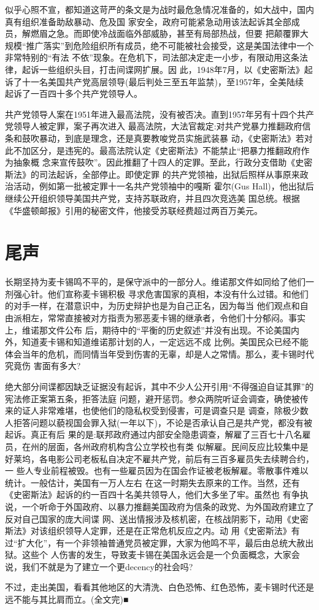 \documentclass[10pt]{article}
\begin{document}
{似乎心照不宣，都知道这苛严的条文是为战时最危急情况准备的，如大战中，国内真有组织准备助敌暴动、危及国
家安全，政府可能紧急动用该法起诉其全部成员，解燃眉之急。而即使冷战面临外部威胁，甚至有局部热战，但要
把颠覆罪大规模``推广落实''到危险组织所有成员，绝不可能被社会接受，这是美国法律中一个非常特别的``有法
不依''现象。在危机下，司法部决定走一小步，有限动用这条法律，起诉一些组织头目，打击间谍网扩展。因
此，1948年7月，以《史密斯法》起诉了十一名美国共产党高层领导(最后判处三至五年监禁)，至1957年，全美陆续
起诉了一百四十多个共产党领导人。

共产党领导人案在1951年进入最高法院，没有被否决。直到1957年另有十四个共产党领导人被定罪，案子再次进入
最高法院，大法官裁定:对共产党暴力推翻政府信条和鼓吹暴动，到底是理念，还是真要教唆党员实施武装暴
动，《史密斯法》若对此不加区分，是违宪的。最高法院认定《史密斯法》不能禁止``把暴力推翻政府作为抽象概
念来宣传鼓吹''。因此推翻了十四人的定罪。至此，行政分支借助《史密斯法》的司法起诉，全部停止。即使定罪
的共产党领袖，出狱后照样从事原来政治活动，例如第一批被定罪十一名共产党领袖中的嘎斯
\textperiodcentered 霍尔(Gus Hall)，他出狱后继续公开组织领导美国共产党，支持苏联政府，并且四次竞选美
国总统。根据《华盛顿邮报》引用的秘密文件，他接受苏联经费超过两百万美元。

\pagebreak
\section{尾声}

长期坚持为麦卡锡鸣不平的，是保守派中的一部分人。维诺那文件如同给了他们一剂强心针。他们宣称麦卡锡积极
寻求危害国家的真相，本没有什么过错。和他们的对手一样，在潜意识中，为历史辩护也是为自己正名，因为每当
他们观点和自由派相左，常常直接被对方指责为邪恶麦卡锡的继承者，令他们十分郁闷。事实上，维诺那文件公布
后，期待中的``平衡的历史叙述''并没有出现。不论美国内外，知道麦卡锡和知道维诺那计划的人，一定远远不成
比例。美国民众已经不能体会当年的危机，而同情当年受到伤害的无辜，却是人之常情。那么，麦卡锡时代究竟伤
害面有多大?

绝大部分间谍都因缺乏证据没有起诉，其中不少人公开引用``不得强迫自证其罪''的宪法修正案第五条，拒答法庭
问题，避开惩罚。参众两院听证会调查，确使被传来的证人非常难堪，也使他们的隐私权受到侵害，可是调查只是
调查，除极少数人拒答问题以藐视国会罪入狱(一年以下)，不论是否承认自己是共产党，都没有被起诉。真正有后
果的是:联邦政府通过内部安全隐患调查，解雇了三百七十八名雇员，在州的层面，各州政府机构含公立学校也有类
似解雇。民间反应比较集中是好莱坞，各电影公司老板私自决定不雇共产党，前后有三百多雇员失去续聘合约，一
些人专业前程被毁。也有一些雇员因为在国会作证被老板解雇。零散事件难以统计。一般估计，美国有一万人左右
在这一时期失去原来的工作。当然，还有《史密斯法》起诉的约一百四十名美共领导人，他们大多坐了牢。虽然也
有争执说，一个听命于外国政府、以暴力推翻美国政府为信条的政党、为外国政府建立了反对自己国家的庞大间谍
网、送出情报涉及核机密，在核战阴影下，动用《史密斯法》对该组织领导人定罪，还是在正常危机反应之内。动
用《史密斯法》有过``扩大化''，有一个非领袖普通党员被定罪，大家为他鸣不平，最后由总统大赦出狱。这些个
人伤害的发生，导致麦卡锡在美国永远会是一个负面概念，大家会说，我们不就是为了建立一个更decency的社会吗?

不过，走出美国，看看其他地区的大清洗、白色恐怖、红色恐怖，麦卡锡时代还是远不能与其比肩而立。(全文完)■

}
\end{document}
